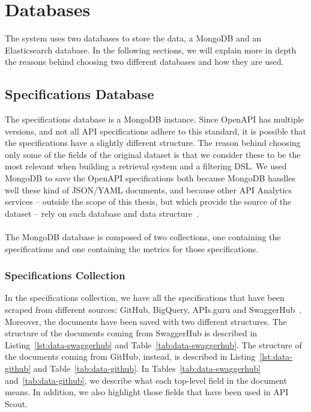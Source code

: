 \section{Databases}\label{sec:databases}

The system uses two databases to store the data, a MongoDB and an Elasticsearch database.
In the following sections, we will explain more in depth the reasons behind choosing two different databases and how they are used.

\subsection{Specifications Database}\label{subsec:specifications-database}
The specifications database is a MongoDB instance.
Since OpenAPI has multiple versions, and not all API specifications adhere to this standard, it is possible that the specifications have a slightly different structure.
The reason behind choosing only some of the fields of the original dataset is that we consider these to be the most relevant when building a retrieval system and a filtering DSL\@.
We used MongoDB to save the OpenAPI specifications both because MongoDB handles well these kind of JSON/YAML documents, and because other API Analytics services -- outside the scope of this thesis, but which provide the source of the dataset -- rely on such database and data structure~\cite{souhaila_serbout_apistic_2024}. \\ \\
The MongoDB database is composed of two collections, one containing the specifications and one containing the metrics for those specifications.

\subsubsection{Specifications Collection}
In the specifications collection, we have all the specifications that have been scraped from different sources: GitHub, BigQuery, APIs.guru and SwaggerHub~\cite{souhaila_serbout_apistic_2024}.
Moreover, the documents have been saved with two different structures.
The structure of the documents coming from SwaggerHub is described in Listing~\ref{lst:data-swaggerhub} and Table~\ref{tab:data-swaggerhub}.
The structure of the documents coming from GitHub, instead, is described in Listing~\ref{lst:data-github} and Table~\ref{tab:data-github}.
In Tables~\ref{tab:data-swaggerhub} and~\ref{tab:data-github}, we describe what each top-level field in the document means.
In addition, we also highlight those fields that have been used in API Scout.

